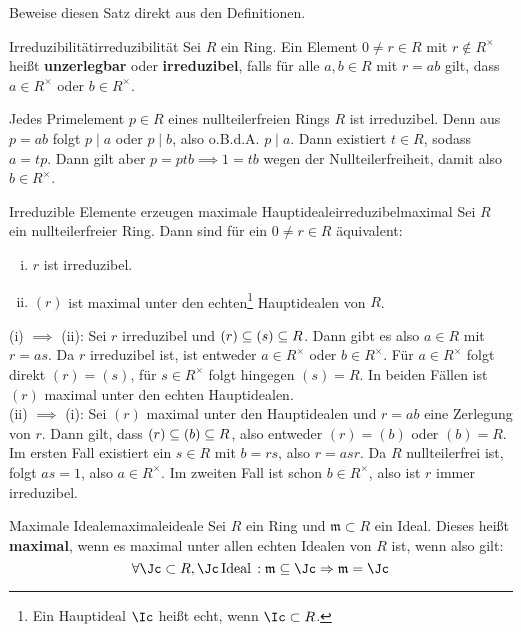 \begin{übung}
Beweise diesen Satz direkt aus den Definitionen.
\end{übung}
\begin{definition}{Irreduzibilität}{irreduzibilität}
Sei $R$ ein Ring. Ein Element $0 \neq r \in R$ mit $r \notin R^\times$ heißt \textbf{unzerlegbar} oder \textbf{irreduzibel}, falls für alle $a,b \in R$ mit $r=ab$ gilt, dass $a \in R^\times$ oder $b \in R^\times$.
\end{definition}
\begin{beispiel}
Jedes Primelement $p \in R$ eines nullteilerfreien Rings $R$ ist irreduzibel. Denn aus $p = ab$ folgt $p \mid a$ oder $p \mid b$, also o.B.d.A. $p \mid a$. Dann existiert $t \in R$, sodass $a = tp$. Dann gilt aber $p=ptb \implies 1 = tb$ wegen der Nullteilerfreiheit, damit also $b \in R^\times$.
\end{beispiel}
\begin{satz}{Irreduzible Elemente erzeugen maximale Hauptideale}{irreduzibelmaximal}
Sei $R$ ein nullteilerfreier Ring. Dann sind für ein $0 \neq r \in R$ äquivalent:
\begin{enumerate}[(i)]
\item $r$ ist irreduzibel.
\item $(r)$ ist maximal unter den echten\footnote{Ein Hauptideal $\Ic$ heißt echt, wenn $\Ic \subset R$.} Hauptidealen von $R$.
\end{enumerate}
\end{satz}
\begin{beweis}
(i) $\implies$ (ii): Sei $r$ irreduzibel und $(r) \subseteq (s) \subseteq R$. Dann gibt es also $a \in R$ mit $r = as$. Da $r$ irreduzibel ist, ist entweder $a \in R^\times$ oder $b \in R^\times$. Für $a \in R^\times$ folgt direkt $(r)=(s)$, für $s \in R^\times$ folgt hingegen $(s)=R$. In beiden Fällen ist $(r)$ maximal unter den echten Hauptidealen.\\
(ii) $\implies$ (i): Sei $(r)$ maximal unter den Hauptidealen und $r=ab$ eine Zerlegung von $r$. Dann gilt, dass $(r)\subseteq (b) \subseteq R$, also entweder $(r) = (b)$ oder $(b)=R$. Im ersten Fall existiert ein $s \in R$ mit $b=rs$, also $r = asr$. Da $R$ nullteilerfrei ist, folgt $as=1$, also $a \in R^\times$. Im zweiten Fall ist schon $b \in R^\times$, also ist $r$ immer irreduzibel.
\end{beweis}
\begin{definition}{Maximale Ideale}{maximaleideale}
Sei $R$ ein Ring und $\mathfrak{m} \subset R$ ein Ideal. Dieses heißt \textbf{maximal}, wenn es maximal unter allen echten Idealen von $R$ ist, wenn also gilt:
\begin{equation}
\forall \Jc \subset R, \Jc \, \text{Ideal} \, : \mathfrak{m} \sub \Jc \implies \mathfrak{m} = \Jc
\end{equation}
\end{definition}
